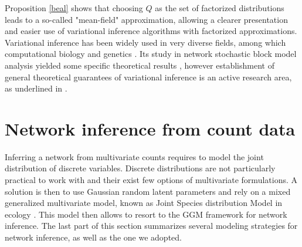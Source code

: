Proposition \ref{beal} shows that choosing $Q$ as the set of factorized distributions leads to a so-called "mean-field" approximation, allowing a clearer presentation and easier use of variational inference algorithms with factorized approximations. Variational inference has been widely used in very diverse fields, among which computational biology and genetics \citep{CS12,RSP14}. Its study in network stochastic block model analysis yielded some specific theoretical results \citep{CDP12,BCC13}, however establishment of general theoretical guarantees of variational inference is an active research area, as underlined in \citet{BKM17}. 

\section{Network inference from count data}
 Inferring a network  from multivariate counts requires to model the joint distribution of discrete variables. Discrete distributions are not particularly practical to work with and their exist few options of multivariate formulations. A solution is then to use Gaussian random latent parameters and rely on a mixed generalized multivariate model, known as Joint Species distribution Model in ecology \citep{WBO15}. This model then allows to resort to the GGM framework for network inference. The last part of this section summarizes several modeling strategies for network inference, as well as the one we adopted.
  
 
